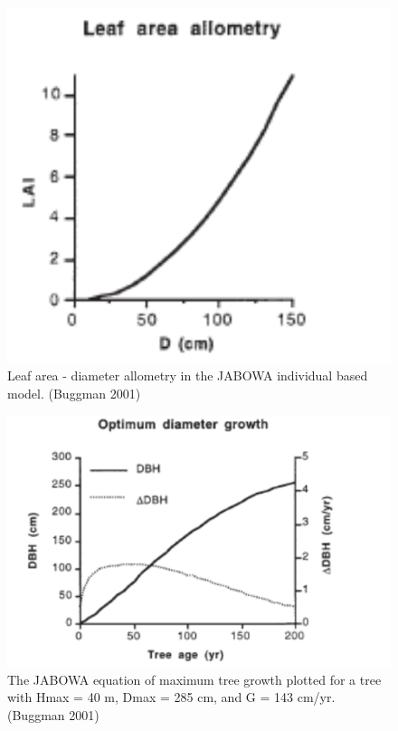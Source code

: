 \documentclass[
  12pt,
  oneside]{book}
\begin{document}
\begin{figure}

{\centering \includegraphics[width=0.8\linewidth]{figures/chap6/f622_LD_allom} 

}

\caption{Leaf area - diameter allometry in the JABOWA individual based model. (Buggman 2001)}\label{fig:f622}
\end{figure}

\begin{figure}

{\centering \includegraphics[width=0.8\linewidth]{figures/chap6/f623_jabowa_growth} 

}

\caption{The JABOWA equation of maximum tree growth plotted for a tree with Hmax = 40 m, Dmax = 285 cm, and G = 143 cm/yr. (Buggman 2001)}\label{fig:f623}
\end{figure}
\end{document}
